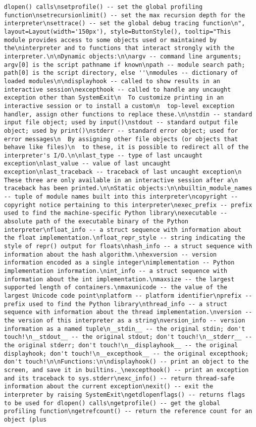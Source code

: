 \documentclass[11pt]{article}
\begin{document}
\begin{verbatim}
dlopen() calls\nsetprofile() -- set the global profiling function\nsetrecursionlimit() -- set the max recursion depth for the interpreter\nsettrace() -- set the global debug tracing function\n", layout=Layout(width='150px'), style=ButtonStyle(), tooltip="This module provides access to some objects used or maintained by the\ninterpreter and to functions that interact strongly with the interpreter.\n\nDynamic objects:\n\nargv -- command line arguments; argv[0] is the script pathname if known\npath -- module search path; path[0] is the script directory, else ''\nmodules -- dictionary of loaded modules\n\ndisplayhook -- called to show results in an interactive session\nexcepthook -- called to handle any uncaught exception other than SystemExit\n  To customize printing in an interactive session or to install a custom\n  top-level exception handler, assign other functions to replace these.\n\nstdin -- standard input file object; used by input()\nstdout -- standard output file object; used by print()\nstderr -- standard error object; used for error messages\n  By assigning other file objects (or objects that behave like files)\n  to these, it is possible to redirect all of the interpreter's I/O.\n\nlast_type -- type of last uncaught exception\nlast_value -- value of last uncaught exception\nlast_traceback -- traceback of last uncaught exception\n  These three are only available in an interactive session after a\n  traceback has been printed.\n\nStatic objects:\n\nbuiltin_module_names -- tuple of module names built into this interpreter\ncopyright -- copyright notice pertaining to this interpreter\nexec_prefix -- prefix used to find the machine-specific Python library\nexecutable -- absolute path of the executable binary of the Python interpreter\nfloat_info -- a struct sequence with information about the float implementation.\nfloat_repr_style -- string indicating the style of repr() output for floats\nhash_info -- a struct sequence with information about the hash algorithm.\nhexversion -- version information encoded as a single integer\nimplementation -- Python implementation information.\nint_info -- a struct sequence with information about the int implementation.\nmaxsize -- the largest supported length of containers.\nmaxunicode -- the value of the largest Unicode code point\nplatform -- platform identifier\nprefix -- prefix used to find the Python library\nthread_info -- a struct sequence with information about the thread implementation.\nversion -- the version of this interpreter as a string\nversion_info -- version information as a named tuple\n__stdin__ -- the original stdin; don't touch!\n__stdout__ -- the original stdout; don't touch!\n__stderr__ -- the original stderr; don't touch!\n__displayhook__ -- the original displayhook; don't touch!\n__excepthook__ -- the original excepthook; don't touch!\n\nFunctions:\n\ndisplayhook() -- print an object to the screen, and save it in builtins._\nexcepthook() -- print an exception and its traceback to sys.stderr\nexc_info() -- return thread-safe information about the current exception\nexit() -- exit the interpreter by raising SystemExit\ngetdlopenflags() -- returns flags to be used for dlopen() calls\ngetprofile() -- get the global profiling function\ngetrefcount() -- return the reference count for an object (plus 
\end{verbatim}
\end{document}
